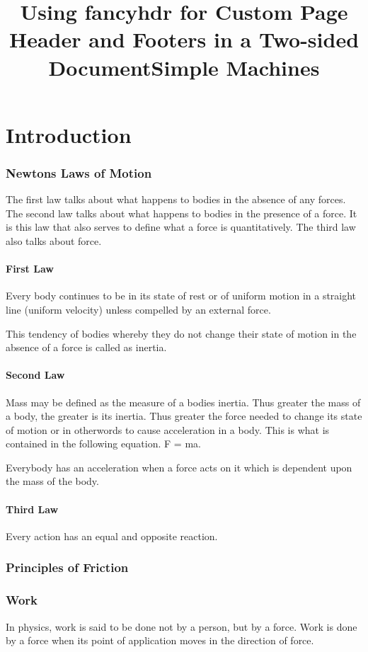 \documentclass[12pt]{book}
\title{Using fancyhdr for Custom Page Header and Footers in a Two-sided Document}
\begin{document}
\title{Simple Machines}
\setcounter{page}{1}
\maketitle
\chapter{Introduction}
\subsection*{Newtons Laws of Motion}
The first law talks about what happens to bodies in the absence of any forces. The second law talks about what happens to bodies in the presence of a force.
It is this law that also serves to define what a force is quantitatively. The third law also talks about force.
\subsubsection{First Law}
Every body continues to be in its state of rest or of uniform motion in a straight line (uniform velocity) unless compelled by an external force.

This tendency of bodies whereby they do not change their state of motion in the absence of a force is called as inertia.
\subsubsection{Second Law}
Mass may be defined as the measure
of a bodies inertia. Thus greater the mass of a body, the greater is its inertia. Thus greater the force needed to change its state of motion or in otherwords
to cause acceleration in a body. This is what is contained in the following equation.
F = ma.

Everybody has an acceleration when a force acts on it which is dependent upon the mass of the body.

\subsubsection{Third Law}
Every action has an equal and opposite reaction.


\subsection*{Principles of Friction}
\subsection*{Work}
In physics, work is said to be done not by a person, but by a force.
Work is done by a force when its point of application moves in the direction of force.
\end{document}
